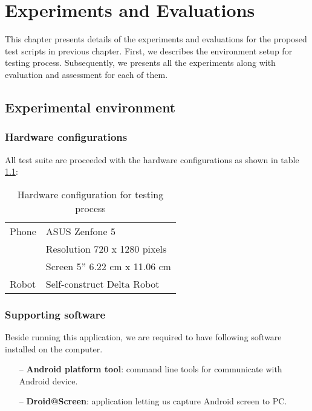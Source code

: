 \chapter{Experiments and Evaluations}
\label{ch:experiments}

This chapter presents details of the experiments and evaluations for the proposed test scripts in previous chapter.
First, we describes the environment setup for testing process.
Subsequently, we presents all the experiments along with evaluation and assessment for each of them.

\section{Experimental environment}

\subsection{Hardware configurations}
All test suite are proceeded with the hardware configurations as shown in table \ref{tab:hw}:

\begin{table}[H]
	\centering
	\caption{Hardware configuration for testing process}	
	\label{tab:hw}
	\begin{tabularx}{0.65\textwidth}{ll}
		\toprule
		Phone & ASUS Zenfone 5 \\
			  & Resolution 720 x 1280 pixels \\
			  & Screen 5'' 6.22 cm x 11.06 cm \\
		\midrule 
		Robot & Self-construct Delta Robot \\
		\bottomrule
	\end{tabularx}
\end{table}

\subsection{Supporting software}
Beside running this application, we are required to have following software installed on the computer.

	\begin{itemize}
		\item[--] \textbf{Android platform tool}: command line tools for communicate with Android device.
		\item[--] \textbf{Droid@Screen}: application letting us capture Android screen to PC.
	\end{itemize}

